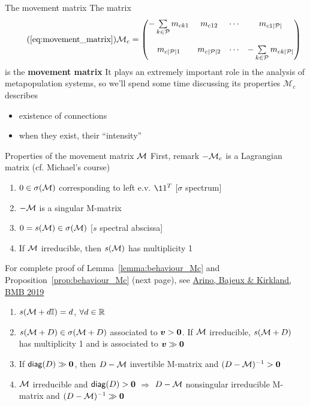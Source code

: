 \documentclass[aspectratio=169]{beamer}\usepackage[]{graphicx}\usepackage[]{xcolor}
\begin{document}
\begin{frame}{The movement matrix}
	The matrix
	\begin{equation}\tag{\ref{eq:movement_matrix}}
		\mathcal{M}_c =
		\begin{pmatrix}
		-\sum\limits_{k\in\P}m_{ck1} & m_{c12} & \cdots & m_{c1|\P|} \\
		& & & \\
		m_{c|\P|1} & m_{c|\P|2} & \cdots & -\sum\limits_{k\in\P}m_{ck|\P|}
		\end{pmatrix}
	\end{equation}
	is the \textbf{movement matrix}
	\vfill
	It plays an extremely important role in the analysis of metapopulation systems, so we'll spend some time discussing its properties
	\vfill
$\mathcal{M}_c$ describes
\begin{itemize} 
\item existence of connections
\item when they exist, their ``intensity''
\end{itemize}
\end{frame}

\begin{frame}{Properties of the movement matrix $\mathcal{M}$}
	First, remark $-\mathcal{M}_c$ is a Lagrangian matrix (cf. Michael's course)
	\vfill
	\begin{lemma}\label{lemma:behaviour_Mc}
		\begin{enumerate}
			\item $0\in\sigma(\mathcal{M})$ corresponding to left e.v. $\11^T$ \hfill[$\sigma$ spectrum]
			\item $-\mathcal{M}$ is a singular M-matrix
			\item $0=s(\mathcal{M})\in\sigma(\mathcal{M})$ \hfill[$s$ spectral abscissa]
			\item If $\mathcal{M}$ irreducible, then $s(\mathcal{M})$ has multiplicity 1
		\end{enumerate}
	\end{lemma}
	\vfill
	For complete proof of Lemma~\ref{lemma:behaviour_Mc} and Proposition~\ref{prop:behaviour_Mc} (next page), see \href{http://dx.doi.org/10.1007/s11538-019-00593-1}{Arino, Bajeux \& Kirkland, BMB 2019}
\end{frame}

\begin{frame}
	\begin{proposition}
		\label{prop:behaviour_Mc}
		\begin{enumerate}
			\item $s(\mathcal{M}+d\mathbb{I})=d$, $\forall d\in\mathbb{R}$
			\item $s(\mathcal{M}+D)\in\sigma(\mathcal{M}+D)$ associated to $\bv>\b0$. If $\mathcal{M}$ irreducible, $s(\mathcal{M}+D)$ has  multiplicity 1 and is associated to $\bv\gg \b0$
			\item If $\diag (D)\gg \b0$, then $D-\mathcal{M}$ invertible M-matrix and $(D-\M)^{-1}> \b0$
			\item $\mathcal{M}$ irreducible and $\diag(D)>\b0$ $\Longrightarrow$ $D-\mathcal{M}$ nonsingular irreducible M-matrix and $(D-\M)^{-1}\gg \b0$		
		\end{enumerate}
	\end{proposition}
\end{frame}
\end{document}
